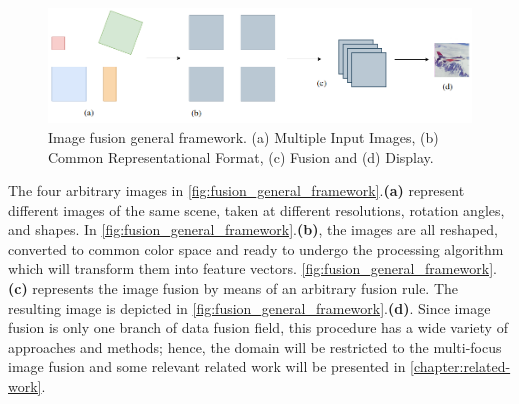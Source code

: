 \begin{figure}[ht]
	\centering
	\caption{\label{fig:fusion_general_framework}Image fusion general framework. (a) Multiple Input Images, (b) Common Representational Format, (c) Fusion and (d) Display.}
	\begin{center}
    \includegraphics[scale=0.45, trim={0 -1.5cm 0cm -1.5cm}, clip]{images/image_fusion_scheme.png}
	\end{center}
	\centering
    \fautor
\end{figure}

The four arbitrary images in \autoref{fig:fusion_general_framework}.\textbf{(a)} represent different images of the same scene, taken at different resolutions, rotation angles, and shapes. In \autoref{fig:fusion_general_framework}.\textbf{(b)}, the images are all reshaped, converted to common color space and ready to undergo the processing algorithm which will transform them into feature vectors. \autoref{fig:fusion_general_framework}.\textbf{(c)} represents the image fusion by means of an arbitrary fusion rule. The resulting image is depicted in \autoref{fig:fusion_general_framework}.\textbf{(d)}. Since image fusion is only one branch of data fusion field, this procedure has a wide variety of approaches and methods; hence, the domain will be restricted to the multi-focus image fusion and some relevant related work will be presented in \autoref{chapter:related-work}.
